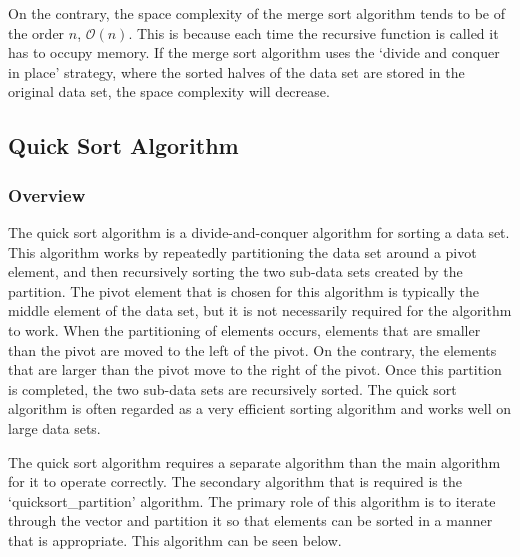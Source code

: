 \begin{highlight}
On the contrary, the space complexity of the merge sort algorithm tends to be of the order $n$, $\mathcal{O}(n)$. This is because each time the recursive function is called it has to occupy memory. If the merge sort algorithm uses the `divide and conquer in place' strategy, where the sorted halves of the data set are stored in the original data set, 
the space complexity will decrease.
\end{highlight}

\subsection*{Quick Sort Algorithm}

\subsubsection*{Overview}

The quick sort algorithm is a divide-and-conquer algorithm for sorting a data set. This algorithm works by repeatedly partitioning the data set around a pivot element, and then recursively sorting the two sub-data sets
created by the partition. The pivot element that is chosen for this algorithm is typically the middle element of the data set, but it is not necessarily required for the algorithm to work. When the partitioning of elements
occurs, elements that are smaller than the pivot are moved to the left of the pivot. On the contrary, the elements that are larger than the pivot move to the right of the pivot. Once this partition is completed, the two
sub-data sets are recursively sorted. The quick sort algorithm is often regarded as a very efficient sorting algorithm and works well on large data sets.

The quick sort algorithm requires a separate algorithm than the main algorithm for it to operate correctly. The secondary algorithm that is required is the `quicksort\_partition' algorithm. The primary role of this algorithm
is to iterate through the vector and partition it so that elements can be sorted in a manner that is appropriate. This algorithm can be seen below.

